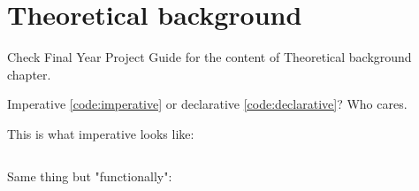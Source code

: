 \chapter{Theoretical background}

Check Final Year Project Guide for the content of Theoretical background chapter.

Imperative \ref{code:imperative} or declarative \ref{code:declarative}? Who cares.

This is what imperative looks like:
\begin{code} 
  \inputminted{javascript}{code/imperative.js} 
  \label{code:imperative}
\end{code}

Same thing but "functionally":
\begin{code}
  \inputminted{javascript}{code/declarative.js} 
  \label{code:declarative}
\end{code}